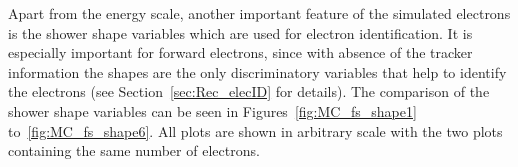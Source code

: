 Apart from the energy scale, another important feature of the simulated electrons is the shower shape variables which are used for electron identification. It is especially important for forward electrons, since with absence of the tracker information the shapes are the only discriminatory variables that help to identify the electrons (see Section~\ref{sec:Rec_elecID} for details). The comparison of the shower shape variables can be seen in Figures~\ref{fig:MC_fs_shape1} to~\ref{fig:MC_fs_shape6}. All plots are shown in arbitrary scale with the two plots containing the same number of electrons.

\begin{figure}
\end{figure}

\begin{figure}
\end{figure}

